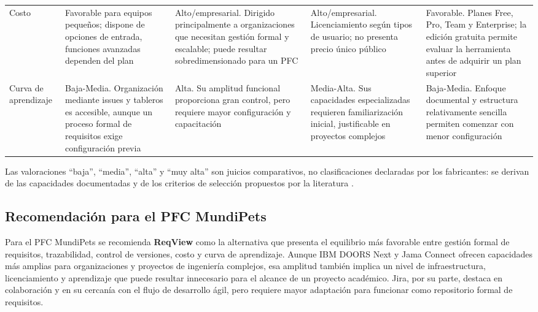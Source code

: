 \documentclass[journal,onecolumn]{IEEEtran}
\begin{document}
\begin{longtable}{@{}p{2.1cm} p{2.6cm} p{2.6cm} p{2.6cm} p{2.6cm}@{}}
		Costo & Favorable para equipos pequeños; dispone de opciones de entrada, funciones avanzadas dependen del plan & Alto/empresarial. Dirigido principalmente a organizaciones que necesitan gestión formal y escalable; puede resultar sobredimensionado para un PFC & Alto/empresarial. Licenciamiento según tipos de usuario; no presenta precio único público \cite{JamaSoftware2026} & Favorable. Planes Free, Pro, Team y Enterprise; la edición gratuita permite evaluar la herramienta antes de adquirir un plan superior \cite{ReqView2026} \\
		Curva de aprendizaje & Baja-Media. Organización mediante issues y tableros es accesible, aunque un proceso formal de requisitos exige configuración previa & Alta. Su amplitud funcional proporciona gran control, pero requiere mayor configuración y capacitación & Media-Alta. Sus capacidades especializadas requieren familiarización inicial, justificable en proyectos complejos & Baja-Media. Enfoque documental y estructura relativamente sencilla permiten comenzar con menor configuración \cite{ReqView2026} \\
		\bottomrule
	\end{longtable}
	
	Las valoraciones ``baja'', ``media'', ``alta'' y ``muy alta'' son juicios comparativos, no clasificaciones declaradas por los fabricantes: se derivan de las capacidades documentadas y de los criterios de selección propuestos por la literatura \cite{Ozkaya2023, Bjarnason2023}.
	
	\subsection*{Recomendación para el PFC MundiPets}
	
	Para el PFC MundiPets se recomienda \textbf{ReqView} como la alternativa que presenta el equilibrio más favorable entre gestión formal de requisitos, trazabilidad, control de versiones, costo y curva de aprendizaje. Aunque IBM DOORS Next y Jama Connect ofrecen capacidades más amplias para organizaciones y proyectos de ingeniería complejos, esa amplitud también implica un nivel de infraestructura, licenciamiento y aprendizaje que puede resultar innecesario para el alcance de un proyecto académico. Jira, por su parte, destaca en colaboración y en su cercanía con el flujo de desarrollo ágil, pero requiere mayor adaptación para funcionar como repositorio formal de requisitos.
	
\end{document}
